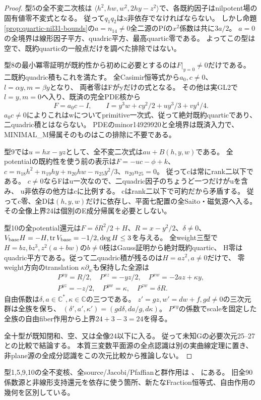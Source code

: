 \documentclass[a4paper,11pt]{ltjsarticle}
\theoremstyle{definition}
\begin{document}
\begin{proof}
型5の全不変二次核は
$\langle h^2,hw,w^2,2hy-z^2\rangle$で、各既約因子はnilpotent場の固有値零不変式となる。
従って$q_1q_2$はx非依存でなければならない。
しかし命題\ref{prop:quartic-nil31-bounds}の$a=n_{14}\ne0$全二源のPfの$x^2$係数は共に$3a/2$。
$a=0$の全境界は線形因子平方、quadric平方、最高quartic零である。
よってこの型は空で、既約quarticの一般点だけを調べた排除ではない。

型8の最小冪零証明が既約性から初めに必要とするのは$F|_{y=0}\ne0$だけである。
二既約quadric積もこれを満たす。
全Casimir恒等式から$a_0,c\ne0$、$l=\alpha y,m=\beta y$となり、
両者零はFがyだけの式となる。
その他は実GL2で$l=y,m=0$へ入り、既済の完全PDE核から
\[
 F=a_0c-I,\qquad I=y^3w+cy^2/2+uy^3/3+vy^4/4.
\]
$a_0c\ne0$によりこれはwについてprimitive一次式、従って絶対既約quarticであり、二quadric積とはならない。
PDEのminor14929920と全境界は既済入力で、MINIMAL\_M帰属そのものはこの排除に不要である。

型9では$u=hx-yz$として、全不変二次式は$au+B(h,y,w)$である。
全potentialの既約性を使う前の表示は$F=-uc-\phi+k$、
$c=n_{18}h^2+n_{19}hy+n_{20}hw-n_{25}y^2/3$、$n_{20}n_{25}=0$。
従ってcは常にrank二以下である。
$c\ne0$ならFはu一次なので、二quadric因子のちょうど一つだけがuを含み、
u非依存の他方はcに比例する。
cはrank二以下で可約だから矛盾する。
従ってc零、全Dは$(h,y,w)$だけに依存し、平面七配置の全Saito・磁気源へ入る。
その全像上界24は個別のE成分帰属を必要としない。

型10の全potential還元は$F=\delta R^2/2+H$、$R=x-y^2/2$、$\delta\ne0$、
$V_{\rm base}H=-H,\operatorname{tr}V_{\rm base}=-1/2,\deg H\le3$を与える。
全weight三型で$H=bz,bz^3,z^2(a+bw)$の$b\ne0$枝はGauss証明から絶対既約quartic、
H零はquadric平方である。従って二quadric積が残るのは$H=az^2,a\ne0$だけで、
零weight方向のtranslation $\kappa\partial_w$も保持した全源は
\[
 \begin{gathered}
 P^{xy}=R/2,\quad P^{xz}=-yz/2,\quad P^{xw}=-2az+\kappa y,\\
 P^{yz}=-z/2,\quad P^{yw}=\kappa,\quad P^{zw}=\delta R.
 \end{gathered}
\]
自由係数は$\delta,a\in\mathbb C^*,\kappa\in\mathbb C$の三つである。
$z'=gz,w'=dw+f,gd\ne0$の三次元群は全族を保ち、
$(\delta',a',\kappa')=(gd\delta,da/g,d\kappa)$。
$P^{xy}$の係数でscaleを固定した全族の自由fiber作用から上界$24+3-3=24$を得る。

全十型が既知閉和、空、又は全像24以下に入る。
従って未知Gの必要次元25--27との比較で結論する。
本質三変数平面源の全点認識は別の実曲線定理に置き、非plane源の全成分認識をこの次元比較から推論しない。
\end{proof}
型1,5,9,10の全不変核、全source/Jacobi/Pfaffianと群作用は
、
にある。
旧全90係数源と非線形支持還元を依存に使う箇所、新たなFraction恒等式、自由作用の幾何を区別している。
\end{document}

